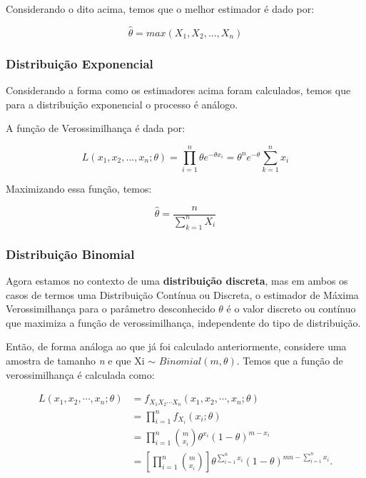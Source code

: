 Considerando o dito acima, temos que o melhor estimador é dado por:

\begin{equation}
	\hat{\theta} = max(X_{1}, X_{2}, ..., X_{n})
\end{equation}

\subsubsection{Distribuição Exponencial}

Considerando a forma como os estimadores acima foram calculados, temos que para a distribuição exponencial o processo é análogo.

A função de Verossimilhança é dada por:

\begin{equation}
L(x_{1}, x_{2}, ..., x_{n}; \theta) = \prod_{i=1}^{n} \theta e^{-\theta x_{i}} = \theta^{n}e^{-\theta}\sum_{k=1}^{n}x_{i}
\end{equation}

Maximizando essa função, temos:

\begin{equation}
\hat{\theta} = \frac{n}{\sum_{k=1}^{n}X_{i}}
\end{equation}

\subsubsection{Distribuição Binomial}

Agora estamos no contexto de uma \textbf{distribuição discreta}, mas em ambos os casos de termos uma Distribuição Contínua ou Discreta, o estimador de Máxima Verossimilhança para o parâmetro desconhecido \begin{math} \theta \end{math} é o valor discreto ou contínuo que maximiza a função de verossimilhança, independente do tipo de distribuição.

Então, de forma análoga ao que já foi calculado anteriormente, considere uma amostra de tamanho \emph{n} e que 
Xi $\sim$ \begin{math} Binomial(m, \theta) \end{math}. Temos que a função de verossimilhança é calculada como:

\begin{align}
       L(x_1, x_2, \cdots, x_n; \theta)&= f_{X_1 X_2 \cdots X_n}(x_1, x_2, \cdots, x_n; \theta)\\
       &=\prod_{i=1}^{n} f_{X_i}(x_i; \theta)\\
       &=\prod_{i=1}^{n} {m \choose x_i} \theta^{x_i} (1-\theta)^{m-x_i}\\
       &=\left[\prod_{i=1}^{n} {m \choose x_i} \right] \theta^{\sum_{i=1}^n x_i} (1-\theta)^{mn-\sum_{i=1}^n x_i}.
\end{align}

